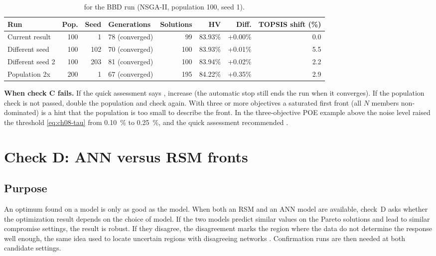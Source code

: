\begin{table}[htbp]
\centering
\small
\caption{ for the BBD run (NSGA-II, population 100, seed 1).}
\label{tab:ch08-popcheck}
\begin{tabular}{@{}lrrlrrrr@{}}
\toprule
Run & Pop. & Seed & Generations & Solutions & HV & Diff. & TOPSIS shift (\%) \\
\midrule
Current result & 100 & 1 & 78 (converged) & 99 & 83.93\% & +0.00\% & 0.0 \\
Different seed & 100 & 102 & 70 (converged) & 100 & 83.93\% & +0.01\% & 5.5 \\
Different seed 2 & 100 & 203 & 81 (converged) & 100 & 83.94\% & +0.02\% & 2.2 \\
Population 2x & 200 & 1 & 67 (converged) & 195 & 84.22\% & +0.35\% & 2.9 \\
\bottomrule
\end{tabular}
\end{table}

\textbf{When check C fails.} If the quick assessment says , increase  (the automatic stop still ends the run when it converges). If the population check is not passed,
double the population and check again. With three or more objectives a saturated first front (all $N$ members
non-dominated) is a hint that the population is too small to describe the front. In the three-objective POE example
above the noise level raised the threshold \eqref{eq:ch08-tau} from 0.10~\% to 0.25~\%, and the quick assessment
recommended .

\section{Check D: ANN versus RSM fronts}
\label{sec:ch08-checkD}

\subsection{Purpose}
An optimum found on a model is only as good as the model. When both an RSM and an ANN model are available, check~D
asks whether the optimization result depends on the choice of model. If the two models predict similar values on
the Pareto solutions and lead to similar compromise settings, the result is robust. If they disagree, the
disagreement marks the region where the data do not determine the response well enough, the same idea used to
locate uncertain regions with disagreeing networks \citep{krogh1995}. Confirmation runs are then needed at both
candidate settings.

